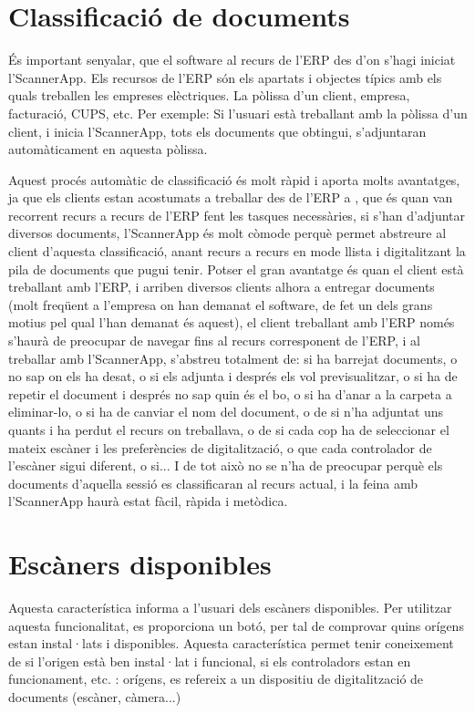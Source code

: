 \documentclass[letterpaper,11pt,catalan]{sphinxmanual}
\begin{document}
\section{Classificació de documents}
\label{\detokenize{index:classificacio-de-documents}}
És important senyalar, que el software  al recurs de l'ERP des d'on s'hagi iniciat l'ScannerApp. Els recursos de l'ERP són els apartats i objectes típics amb els quals treballen les empreses elèctriques. La pòlissa d'un client, empresa, facturació, CUPS, etc.
Per exemple: Si l'usuari està treballant amb la pòlissa d'un client, i inicia l'ScannerApp, tots els documents que obtingui, s'adjuntaran automàticament en aquesta pòlissa.

Aquest procés automàtic de classificació és molt ràpid i aporta molts avantatges, ja que els clients estan acostumats a treballar des de l'ERP a , que és quan van recorrent recurs a recurs de l'ERP fent les tasques necessàries, si s'han d'adjuntar diversos documents, l'ScannerApp és molt còmode perquè permet abstreure al client d'aquesta classificació, anant recurs a recurs en mode llista i digitalitzant la pila de documents que pugui tenir. Potser el gran avantatge és quan el client està treballant amb l'ERP, i arriben diversos clients alhora a entregar documents (molt freqüent a l'empresa on han demanat el software, de fet un dels grans motius pel qual l'han demanat és aquest), el client treballant amb l'ERP només s'haurà de preocupar de navegar fins al recurs corresponent de l'ERP, i al treballar amb l'ScannerApp, s'abstreu totalment de: si ha barrejat documents, o no sap on els ha desat, o si els adjunta i
després els vol previsualitzar, o si ha de repetir el document i després no sap quin és el bo, o
si ha d'anar a la carpeta a eliminar-lo, o si ha de canviar el nom del document, o de si n'ha
adjuntat uns quants i ha perdut el recurs on treballava, o de si cada cop ha de seleccionar el mateix escàner i
les preferències de digitalització, o que cada controlador de l'escàner sigui diferent, o si... I de tot això no se n'ha de preocupar perquè els documents d'aquella sessió es classificaran al recurs actual, i la feina amb l'ScannerApp haurà estat fàcil, ràpida i metòdica.


\section{Escàners disponibles}
\label{\detokenize{index:escaners-disponibles}}
Aquesta característica informa a l'usuari dels escàners disponibles. Per utilitzar
aquesta funcionalitat, es proporciona un botó, per tal de comprovar quins orígens
estan instal·lats i disponibles. Aquesta característica permet tenir coneixement
de si l'origen està ben instal·lat i funcional, si els controladors estan en funcionament, etc.
: orígens, es refereix a un dispositiu de digitalització de documents (escàner, càmera...)
\end{document}
